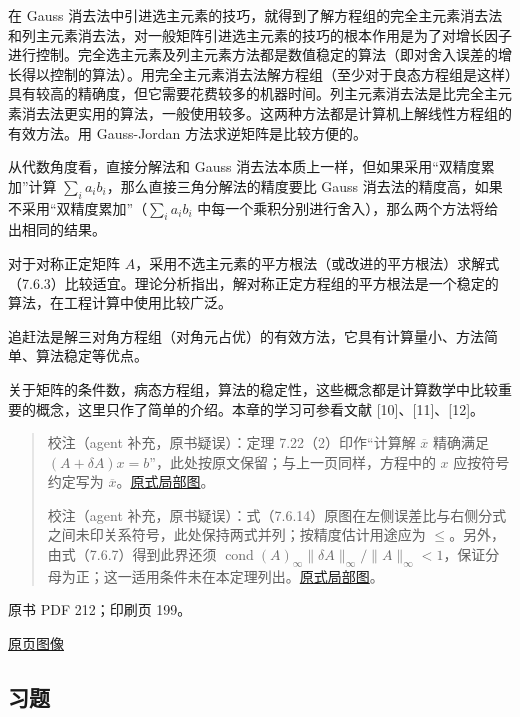 \documentclass[
  10pt,
  fontset=fandol]{ctexart}
\begin{document}
在 Gauss
消去法中引进选主元素的技巧，就得到了解方程组的完全主元素消去法和列主元素消去法，对一般矩阵引进选主元素的技巧的根本作用是为了对增长因子进行控制。完全选主元素及列主元素方法都是数值稳定的算法（即对舍入误差的增长得以控制的算法）。用完全主元素消去法解方程组（至少对于良态方程组是这样）具有较高的精确度，但它需要花费较多的机器时间。列主元素消去法是比完全主元素消去法更实用的算法，一般使用较多。这两种方法都是计算机上解线性方程组的有效方法。用
Gauss-Jordan 方法求逆矩阵是比较方便的。

从代数角度看，直接分解法和 Gauss
消去法本质上一样，但如果采用``双精度累加''计算
\(\sum_i a_ib_i\)，那么直接三角分解法的精度要比 Gauss
消去法的精度高，如果不采用``双精度累加''（\(\sum_i a_ib_i\)
中每一个乘积分别进行舍入），那么两个方法将给出相同的结果。

对于对称正定矩阵
\(A\)，采用不选主元素的平方根法（或改进的平方根法）求解式（7.6.3）比较适宜。理论分析指出，解对称正定方程组的平方根法是一个稳定的算法，在工程计算中使用比较广泛。

追赶法是解三对角方程组（对角元占优）的有效方法，它具有计算量小、方法简单、算法稳定等优点。

关于矩阵的条件数，病态方程组，算法的稳定性，这些概念都是计算数学中比较重要的概念，这里只作了简单的介绍。本章的学习可参看文献
{[}10{]}、{[}11{]}、{[}12{]}。

\begin{quote}
校注（agent 补充，原书疑误）：定理 7.22（2）印作``计算解 \(\overline x\)
精确满足 \((A+\delta A)x=b\)''，此处按原文保留；与上一页同样，方程中的
\(x\) 应按符号约定写为
\(\overline x\)。\href{/Users/xiangjunfeng/Desktop/数值计算专用/numerical-analysis/book/staging/ch07b/assets/211-computed-solution.png}{原式局部图}。

校注（agent
补充，原书疑误）：式（7.6.14）原图在左侧误差比与右侧分式之间未印关系符号，此处保持两式并列；按精度估计用途应为
\(\leqslant\)。另外，由式（7.6.7）得到此界还须
\(\operatorname{cond}(A)_\infty\|\delta A\|_\infty/\|A\|_\infty<1\)，保证分母为正；这一适用条件未在本定理列出。\href{/Users/xiangjunfeng/Desktop/数值计算专用/numerical-analysis/book/staging/ch07b/assets/211-error-estimate.png}{原式局部图}。
\end{quote}

\clearpage

原书 PDF 212；印刷页 199。

\href{/Users/xiangjunfeng/Desktop/数值计算专用/numerical-analysis/book/source-images/pdf-212.jpeg}{原页图像}

\subsection{习题}\label{ux4e60ux9898}
\end{document}
